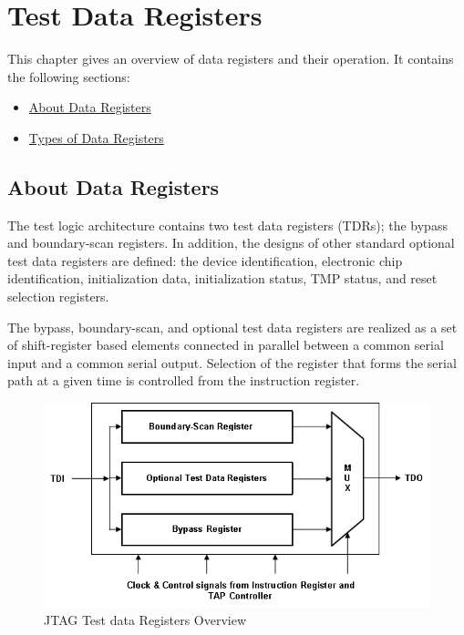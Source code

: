 \chapter{Test Data Registers}
\label{chap:data-reg}

This chapter gives an overview of data registers and their operation. It contains the following sections:
\begin{itemize}
    \item \hyperref[sec:about-data-regs]{About Data Registers}
    \item \hyperref[sec:data-regs-types]{Types of Data Registers}
\end{itemize}

\newpage

\section{About Data Registers}
\label{sec:about-data-regs}

The test logic architecture contains two test data registers (TDRs); the bypass and boundary-scan registers. In addition, the designs of other standard optional test data registers are defined: the device identification, electronic chip identification, initialization data, initialization status, TMP status, and reset selection registers.

The bypass, boundary-scan, and optional test data registers are realized as a set of shift-register based elements connected in parallel between a common serial input and a common serial output. Selection of the register that forms the serial path at a given time is controlled from the instruction register.

\vspace{1.25cm}
\begin{figure}[H]
    \centering
    \includegraphics[width = 15cm]{images/test_data_registers.png}
    \vspace{1cm}
    \caption{JTAG Test data Registers Overview}
    \label{fig:data-regs-overview}
\end{figure}
\vspace{1cm}

